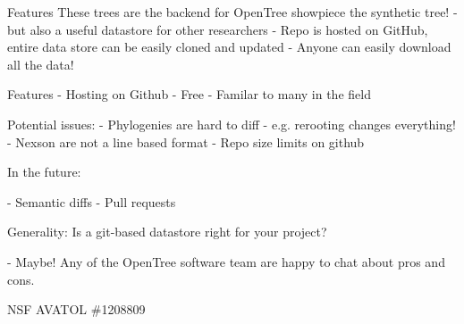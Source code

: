 \documentclass{bioinfo}
\begin{document}
 Features
 These trees are the backend for OpenTree showpiece  
 the synthetic tree!
 - but also a useful datastore for other researchers
 - Repo is hosted on GitHub, entire data store can be easily cloned and updated
 - Anyone can easily download all the data!
 
 Features
- Hosting on Github
- Free  
- Familar to  many in the field


 Potential issues:
 - Phylogenies are hard to diff - e.g. rerooting changes everything!
 - Nexson are not a line based format
 - Repo size limits on github


 In the future:

 - Semantic diffs  
 - Pull requests
 
  
Generality:
Is a git-based datastore right for your project?

 - Maybe! Any of the OpenTree software team are happy to chat about pros and cons.

NSF AVATOL \#1208809  
\end{document}
